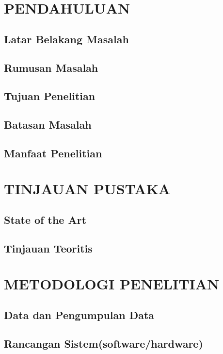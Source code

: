 \documentclass[12pt,a4paper]{report}
\begin{document}



\tableofcontents
{}
\clearpage

\setcounter{page}{1}
\chapter{PENDAHULUAN}
\section{Latar Belakang Masalah}
\section{Rumusan Masalah}
\section{Tujuan Penelitian}
\section{Batasan Masalah}
\section{Manfaat Penelitian}

\chapter{TINJAUAN PUSTAKA}
\section{State of the Art}
\section{Tinjauan Teoritis}

\chapter{METODOLOGI PENELITIAN}
\section{Data dan Pengumpulan Data}
\section{Rancangan Sistem(software/hardware)}
\end{document}
